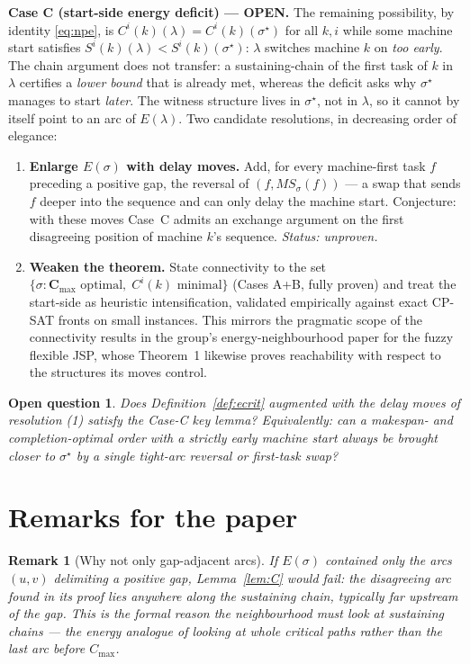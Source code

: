 \documentclass[11pt,a4paper]{article}
\newtheorem{remark}{Remark}
\newtheorem{openq}{Open question}
\newcommand{\Cmax}{C_{\max}}
\begin{document}
\medskip\noindent\textbf{Case C (start-side energy deficit) — OPEN.}
The remaining possibility, by identity \eqref{eq:npe}, is
$C^i(k)(\lambda)=C^i(k)(\sigma^{\star})$ for all $k,i$ while some machine
start satisfies $S^i(k)(\lambda)<S^i(k)(\sigma^{\star})$: $\lambda$ switches
machine $k$ on \emph{too early}. The chain argument does not transfer: a
sustaining-chain of the first task of $k$ in $\lambda$ certifies a
\emph{lower bound} that is already met, whereas the deficit asks why
$\sigma^{\star}$ manages to start \emph{later}. The witness structure lives
in $\sigma^{\star}$, not in $\lambda$, so it cannot by itself point to an
arc of $E(\lambda)$. Two candidate resolutions, in decreasing order of
elegance:
\begin{enumerate}
\item \textbf{Enlarge $E(\sigma)$ with delay moves.} Add, for every
machine-first task $f$ preceding a positive gap, the reversal of
$(f,MS_\sigma(f))$ — a swap that sends $f$ deeper into the sequence and can
only delay the machine start. Conjecture: with these moves Case~C admits an
exchange argument on the first disagreeing position of machine $k$'s
sequence. \emph{Status: unproven.}
\item \textbf{Weaken the theorem.} State connectivity to the set
$\{\sigma:\mathbf{C}_{\max}\text{ optimal},\; C^i(k)\text{ minimal}\}$
(Cases A+B, fully proven) and treat the start-side as heuristic
intensification, validated empirically against exact CP-SAT fronts on
small instances. This mirrors the pragmatic scope of the connectivity
results in the group's energy-neighbourhood paper for the fuzzy flexible
JSP, whose Theorem~1 likewise proves reachability with respect to the
structures its moves control.
\end{enumerate}

\begin{openq}
Does Definition~\ref{def:ecrit} augmented with the delay moves of
resolution (1) satisfy the Case-C key lemma? Equivalently: can a
makespan- and completion-optimal order with a strictly early machine start
always be brought closer to $\sigma^{\star}$ by a single tight-arc reversal
or first-task swap?
\end{openq}

\section{Remarks for the paper}

\begin{remark}[Why not only gap-adjacent arcs]
If $E(\sigma)$ contained only the arcs $(u,v)$ delimiting a positive gap,
Lemma~\ref{lem:C} would fail: the disagreeing arc found in its proof lies
anywhere along the sustaining chain, typically far upstream of the gap.
This is the formal reason the neighbourhood must look at sustaining chains
— the energy analogue of looking at whole critical paths rather than the
last arc before $\Cmax$.
\end{remark}
\end{document}
